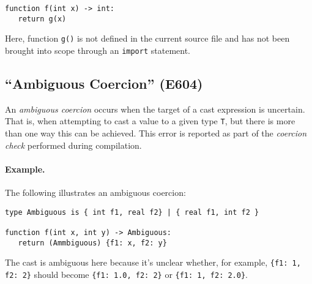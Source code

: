\begin{lstlisting}
function f(int x) -> int:
   return g(x)
\end{lstlisting}

Here, function \lstinline{g()} is not defined in the current source file and has not been brought into scope through an \lstinline{import} statement.

\subsection{``Ambiguous Coercion'' (E604)}

An {\em ambiguous coercion} occurs when the target of a cast expression is uncertain.  That is, when attempting to cast a value to a given type \lstinline{T}, but there is more than one way this can be achieved.  This error is reported as part of the {\em coercion check} performed during compilation.

\paragraph{Example.}  The following illustrates an ambiguous coercion:

\begin{lstlisting}
type Ambiguous is { int f1, real f2} | { real f1, int f2 }

function f(int x, int y) -> Ambiguous:
   return (Ammbiguous) {f1: x, f2: y}
\end{lstlisting}

The cast is ambiguous here because it's unclear whether, for example, \lstinline|{f1: 1, f2: 2}| should become \lstinline|{f1: 1.0, f2: 2}| or \lstinline|{f1: 1, f2: 2.0}|.

